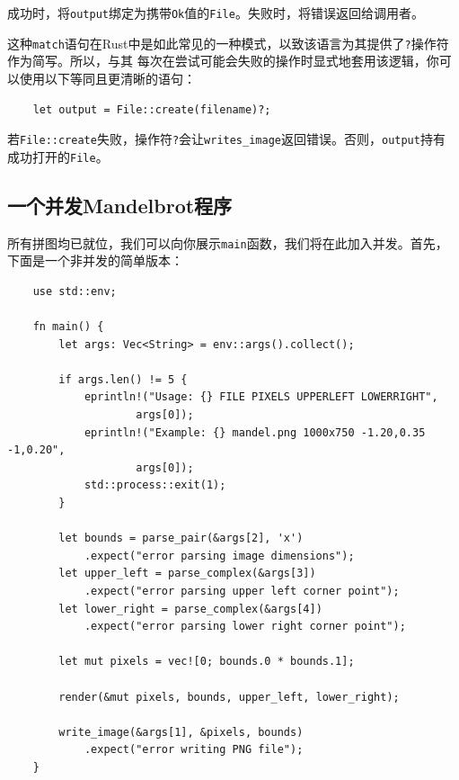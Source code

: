 \smallskip
成功时，将\texttt{output}绑定为携带\texttt{Ok}值的\texttt{File}。失败时，将错误返回给调用者。

\medskip
这种\texttt{match}语句在Rust中是如此常见的一种模式，以致该语言为其提供了\texttt{?}操作符作为简写。所以，与其
每次在尝试可能会失败的操作时显式地套用该逻辑，你可以使用以下等同且更清晰的语句：
\begin{verbatim}
    let output = File::create(filename)?;
\end{verbatim}

\smallskip
若\texttt{File::create}失败，操作符\texttt{?}会让\texttt{writes\_image}返回错误。否则，\texttt{output}持有
成功打开的\texttt{File}。

\smallskip
{}

\medskip
\subsection{一个并发Mandelbrot程序}
所有拼图均已就位，我们可以向你展示\texttt{main}函数，我们将在此加入并发。首先，下面是一个非并发的简单版本：
\begin{verbatim}
    use std::env;

    fn main() {
        let args: Vec<String> = env::args().collect();

        if args.len() != 5 {
            eprintln!("Usage: {} FILE PIXELS UPPERLEFT LOWERRIGHT",
                    args[0]);
            eprintln!("Example: {} mandel.png 1000x750 -1.20,0.35 -1,0.20",
                    args[0]);
            std::process::exit(1);
        }

        let bounds = parse_pair(&args[2], 'x')
            .expect("error parsing image dimensions");
        let upper_left = parse_complex(&args[3])
            .expect("error parsing upper left corner point");
        let lower_right = parse_complex(&args[4])
            .expect("error parsing lower right corner point");

        let mut pixels = vec![0; bounds.0 * bounds.1];

        render(&mut pixels, bounds, upper_left, lower_right);

        write_image(&args[1], &pixels, bounds)
            .expect("error writing PNG file");
    }
\end{verbatim}

